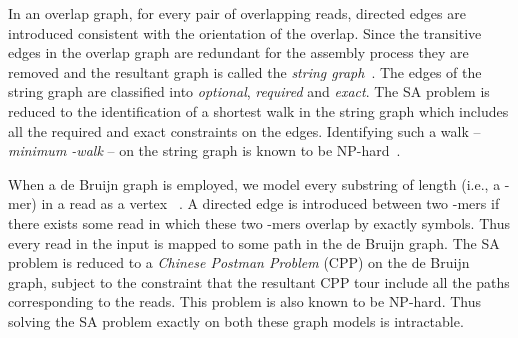 \documentclass[11pt,conference,twocolumn]{IEEEtran}
\begin{document}
In an overlap graph, for every pair of overlapping reads, directed edges are 
introduced consistent with the orientation of the overlap. Since the transitive edges in the 
overlap graph are redundant for the assembly process they are removed and the resultant graph 
is called the {\em string graph}~\cite{myers95}. The edges
of the string graph are classified into {\em optional}, {\em required} and {\em exact}. The 
SA problem is reduced to the identification of a shortest walk in the string graph which includes all the 
required and exact constraints on the edges. Identifying such a walk -- {\em minimum -walk}
-- on the string graph is known to be \textsf{NP}-hard~\cite{bidirected_graph}. 

When a de Bruijn graph is employed, we model every substring of length  (i.e., a -mer) in a read as a vertex ~\cite{pevzner01}.
A directed edge is introduced between two -mers 
if there exists some read in which these two -mers overlap by exactly  symbols. Thus
every read in the input is mapped to some path in the de Bruijn graph. The SA problem
is reduced to a {\em Chinese Postman Problem} (CPP) on the de Bruijn graph, subject to the 
constraint that the resultant CPP tour include all the paths corresponding to the reads.
This problem is also known to be \textsf{NP}-hard. Thus solving the SA problem exactly on 
both these graph models is intractable. 
\end{document}

